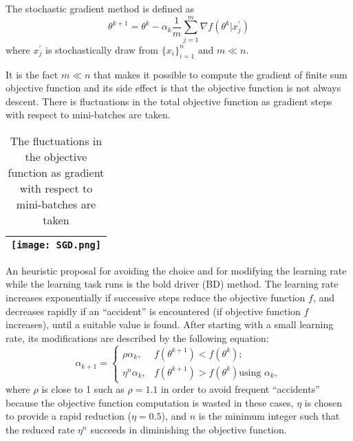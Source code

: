 \documentclass[titlestyle=hang,11pt]{elegantbook}
\begin{document}
The stochastic gradient method is defined as
$$ \theta^{k+1}=\theta^{k}-\alpha_{k}\frac{1}{m}\sum_{j=1}^{m}\nabla f(\theta^{k}| x_{j}^{\prime}) $$
where $x_{j}^{\prime}$ is stochastically draw from $\{x_i\}_{i=1}^{n}$ and $m\ll n$.

It is the fact $m\ll n$ that makes it possible to compute the gradient of finite sum objective function and its side effect is that the objective function is not always descent.
There is fluctuations in the total objective function as gradient steps with respect to mini-batches are taken.

\begin{table}[h]
	\centering
	\caption{The fluctuations in the objective function as gradient with respect to mini-batches are taken}
	\begin{tabular}{|c|}
		\hline
		\texttt{[image: SGD.png]}  \\
		\hline
	\end{tabular}
\end{table}



An heuristic proposal for avoiding the choice and for modifying the learning rate while the learning task runs is the bold driver (BD) method.
The learning rate increases exponentially if successive steps reduce the objective function $f$, 
and decreases rapidly if an ``accident” is encountered (if objective function $f$ increases), until a suitable value is found.
After starting with a small learning rate, its modifications are described by the following equation:
$$
\alpha_{k+1}=
   \begin{cases}
       \rho \alpha_{k}, & {f(\theta^{k+1})< f(\theta^{k})}; \\
       \eta^n \alpha_{k}, & {f(\theta^{k+1})> f(\theta^{k})} \text{using ${\alpha}_k$},
   \end{cases}
$$
where $\rho$ is close to 1 such as $\rho=1.1$  in order to avoid frequent “accidents” because the
objective function computation is wasted in these cases, $\eta$ is chosen to provide a rapid reduction
($\eta = 0.5$), and $n$ is the minimum integer such that the reduced rate $\eta^n$ succeeds in diminishing the objective function.
\end{document}
